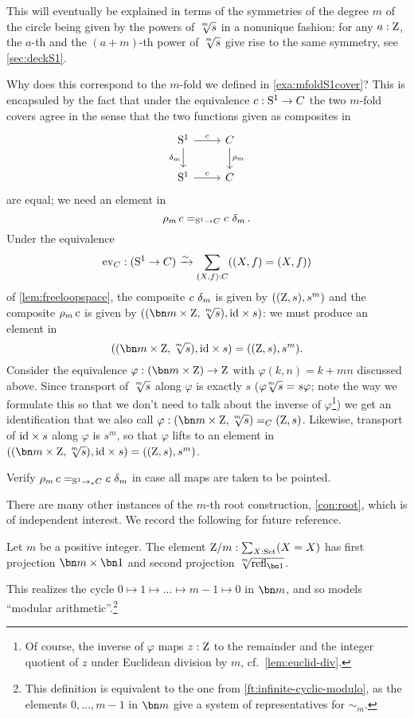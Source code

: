 \begin{example}
This will eventually be explained in terms of the symmetries of the
degree $m$ \covering of the circle being given by the powers of $\sqrt[\uproot{2}m]s$ in a
nonunique fashion: for any $a:\mathrm{Z}$, the $a$-th and the $(a+m)$-th power of
$\sqrt[\uproot{2}m]s$ give rise to the same symmetry, see \cref{sec:deckS1}.

Why does this correspond to the $m$-fold \covering we defined in \cref{exa:mfoldS1cover}?
This is encapsuled by the fact that under the equivalence $c:{\mathrm{S}^1}\to C$ the two $m$-fold covers agree in the sense that the two functions given as composites in
\[
  \begin{tikzcd}
    \Sc\ar[r,"c"]\ar[d,"\dg{m}"'] & C\ar[d,"\cdg{m}"] \\
    \Sc\ar[r,"c"] & C
  \end{tikzcd}
\]
are equal; we need an element in
\[
  \cdg{m}c=_{\Sc\to C}c\,\dg{m}.
\]
Under the equivalence
\[
  \ev_C:(\Sc\to C)\we \sum_{(X,f):C}((X,f)=(X,f))
\]
of \cref{lem:freeloopspace},
the composite $c\,\dg{m}$ is given by $((\mathrm{Z},s),s^m)$
and the composite $\cdg{m}c$ is given by
$((\bn m\times\zet,\sqrt[\uproot{2}m]s),\id\times s)$: we must produce an element in
\[
  ((\bn m\times\zet,\sqrt[\uproot{2}m]s),\id\times s)=((\zet,s),s^m).
\]
Consider the equivalence  $\varphi: (\bn m\times \zet)\to\zet$ with $\varphi(k,n)=k+mn$ discussed above.  Since transport of $\sqrt[\uproot{2}m]s$ along $\varphi$ is exactly $s$ (\ie $\varphi\!\sqrt[\uproot{2}m]s=s\varphi$;
note the way we formulate this so that we don't need to talk about the inverse of $\varphi$\footnote{%
  Of course, the inverse of $\varphi$ maps $z:\mathrm{Z}$ to the remainder and the integer quotient of $z$ under Euclidean division by $m$, cf.~\cref{lem:euclid-div}.})
we get an identification that we also call $\varphi:(\bn m\times\zet,\sqrt[\uproot{2}m]s)=_C(\zet,s)$.  Likewise, transport of $\mathord{\mathrm{id}}\times s$ along $\varphi$ is $s^m$, so that $\varphi$ lifts to an element in
$((\bn m\times\zet,\sqrt[\uproot{2}m]s),\id\times s)=((\zet,s),s^m)$.
\end{example}

\begin{xca}\label{xca:pointed-maps-circle}
Verify $\cdg{m}c=_{\Sc\ptdto C}c\,\dg{m}$ in case all maps are taken to be pointed.
\end{xca}

There are many other instances of the $m$-th root construction, \cref{con:root},
which is of independent interest.
We record the following for future reference.
\begin{definition} \label{def:Zetmodm}
Let $m$ be a positive integer.
The element $\mathrm{Z}/m:\sum_{X:\mathrm{Set}}(X=X)$ has first projection $\bn m\times\bn 1$ and
second projection $\sqrt[\uproot{2}m]{\refl{\bn 1}}$.
\end{definition}
\noindent
This realizes the cycle $0\mapsto1\mapsto\dots\mapsto m-1\mapsto 0$ in $\bn m$,
and so models ``modular arithmetic''.\footnote{%
  This definition is equivalent to the one from \cref{ft:infinite-cyclic-modulo},
  as the elements $0,\dots,m-1$ in $\bn m$ give a system of representatives
  for $\sim_m$.}

